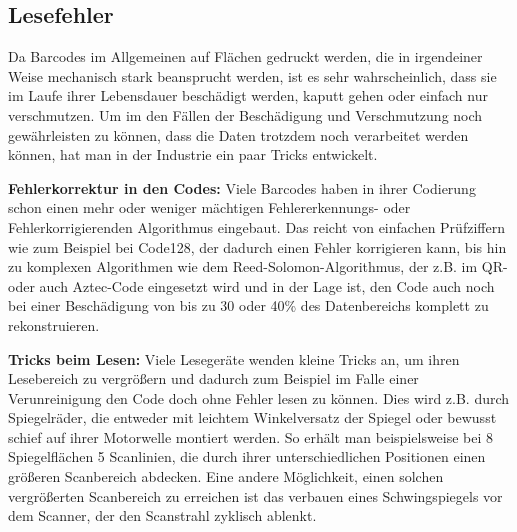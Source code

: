 \subsection{Lesefehler}
Da Barcodes im Allgemeinen auf Flächen gedruckt werden, die in irgendeiner Weise mechanisch stark beansprucht werden, ist es sehr wahrscheinlich, dass sie im Laufe ihrer Lebensdauer beschädigt werden, kaputt gehen oder einfach nur verschmutzen. Um im den Fällen der Beschädigung und Verschmutzung noch gewährleisten zu können, dass die Daten trotzdem noch verarbeitet werden können, hat man in der Industrie ein paar Tricks entwickelt.

\textbf{Fehlerkorrektur in den Codes:} Viele Barcodes haben in ihrer Codierung schon einen mehr oder weniger mächtigen Fehlererkennungs- oder Fehlerkorrigierenden Algorithmus eingebaut. Das reicht von einfachen Prüfziffern wie zum Beispiel bei Code128, der dadurch einen Fehler korrigieren kann, bis hin zu komplexen Algorithmen wie dem Reed-Solomon-Algorithmus, der z.B. im QR- oder auch Aztec-Code eingesetzt wird und in der Lage ist, den Code auch noch bei einer Beschädigung von bis zu 30 oder 40\% des Datenbereichs komplett zu rekonstruieren. 

\textbf{Tricks beim Lesen:} Viele Lesegeräte wenden kleine Tricks an, um ihren Lesebereich zu vergrößern und dadurch zum Beispiel im Falle einer Verunreinigung den Code doch ohne Fehler lesen zu können. Dies wird z.B. durch Spiegelräder, die entweder mit leichtem Winkelversatz der Spiegel oder bewusst schief auf ihrer Motorwelle montiert werden. So erhält man beispielsweise bei 8 Spiegelflächen 5 Scanlinien, die durch ihrer unterschiedlichen Positionen einen größeren Scanbereich abdecken. Eine andere Möglichkeit, einen solchen vergrößerten Scanbereich zu erreichen ist das verbauen eines Schwingspiegels vor dem Scanner, der den Scanstrahl zyklisch ablenkt.

\pagebreak
